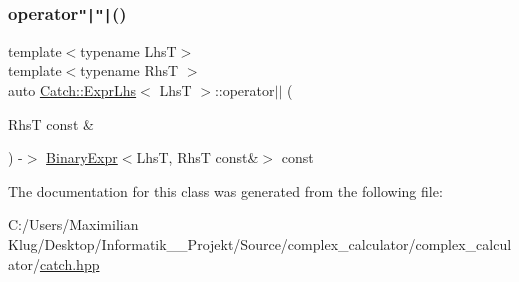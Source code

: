 \subsubsection{\texorpdfstring{operator\texttt{"|}\texttt{"|}()}{operator||()}}
{\footnotesize\ttfamily template$<$typename LhsT$>$ \\
template$<$typename RhsT $>$ \\
auto \mbox{\hyperlink{class_catch_1_1_expr_lhs}{Catch\+::\+Expr\+Lhs}}$<$ LhsT $>$\+::operator$\vert$$\vert$ (\begin{DoxyParamCaption}\item[{RhsT const \&}]{ }\end{DoxyParamCaption}) -\/$>$ \mbox{\hyperlink{class_catch_1_1_binary_expr}{Binary\+Expr}}$<$LhsT, RhsT const\&$>$ const \hspace{0.3cm}{\ttfamily [inline]}}



The documentation for this class was generated from the following file\+:\begin{DoxyCompactItemize}
\item 
C\+:/\+Users/\+Maximilian Klug/\+Desktop/\+Informatik\+\_\+\_\+\+Projekt/\+Source/complex\+\_\+calculator/complex\+\_\+calculator/\mbox{\hyperlink{catch_8hpp}{catch.\+hpp}}\end{DoxyCompactItemize}
